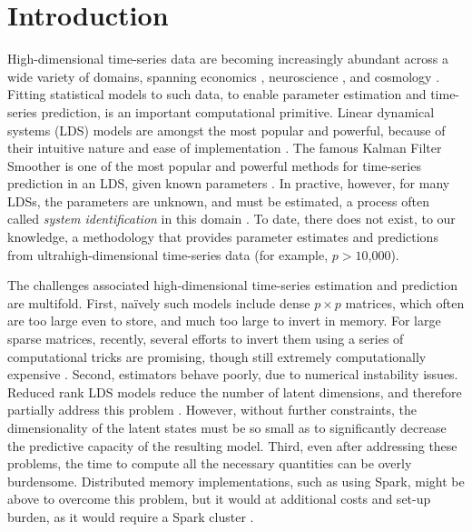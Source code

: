 \documentclass[fleqn]{article}
\newcommand{\mrsid}{{\sc \texttt{Mr}.~\texttt{Sid}}}
\begin{document}
\section{Introduction}

High-dimensional time-series data are becoming increasingly abundant across a wide variety of domains, spanning economics \cite{Johansen1988}, neuroscience \cite{Friston2003a},   and cosmology \cite{Xie2013a}.  
Fitting statistical models to such data, to enable parameter estimation and time-series prediction, is an important computational primitive. 
Linear dynamical systems (LDS) models are amongst the most popular and powerful, because of their intuitive nature and ease of implementation \cite{Kalman1963}.   The famous Kalman Filter Smoother is one of the most popular and powerful methods for time-series prediction in an LDS, given known parameters \cite{Kalman1960a}.
In practive, however, for many LDSs, the parameters are unknown, and must be estimated, a process often called \emph{system identification} in this domain \cite{Ljung1998}.  To date, there does not exist, to our knowledge, a methodology that provides parameter estimates and predictions from ultrahigh-dimensional time-series data (for example, $p > 10$,$000$).

The challenges associated high-dimensional time-series estimation and prediction are multifold.  First, na\"{i}vely such models include dense $p \times p$ matrices, which often are too large even to store, and much too large to invert in memory.  For large sparse matrices, recently, several efforts to invert them using a series of computational tricks are promising, though still extremely computationally expensive  \cite{Hsieh2013, Banerjee2013a}.
Second, estimators behave poorly, due to numerical instability issues.  
Reduced rank LDS models reduce the number of latent dimensions, and therefore partially address this problem \cite{CHEN1989}.  However, without further constraints, the dimensionality of the latent states must be so small as to significantly decrease the predictive capacity of the resulting model.  Third, even after addressing these problems, the time to compute all the necessary quantities can be overly burdensome. Distributed memory implementations, such as using Spark, might be above to overcome this problem, but it would at additional costs and set-up burden, as it would require a Spark cluster \cite{Zaharia2010}.
\end{document}
